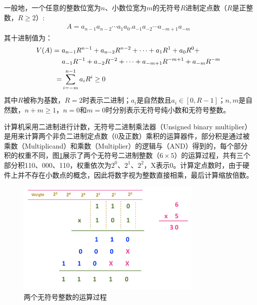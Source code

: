 一般地，一个任意的整数位宽为$n$、小数位宽为$m$的无符号$R$进制定点数（$R$是正整数，$R \geq 2$）:
\begin{equation}
\begin{split}
   A = a_{n-1} a_{n-2} \cdots a_1 a_0 . a_{-1} a_{-2} \cdots a_{-m+1} a_{-m}
\end{split}
\label{EM:Eq:unsigned_fixed_Binary}
\end{equation}
其十进制值为：
\begin{align}
    V(A) = \ & a_{n-1}  R^{n-1} + a_{n-2}  R^{n-2} + \cdots + a_1  R^1 + a_0  R^0 + \notag \\
    & a_{-1}  R^{-1} + a_{-2}  R^{-2} + \cdots + a_{-m+1}  R^{-m+1} + a_{-m}  R^{-m} \notag \\
    = & \sum_{i=-m}^{n-1} a_i  R^i \ge 0
\label{EM:Eq:unsigned_fixed_Decimal}
\end{align}
其中$R$被称为基数，$R=2$时表示二进制；$a_i$是自然数且$a_i \in [0,R-1]$；$n,m$是自然数，$n+m \ge 1$，$n=0$和$m=0$时分别表示无符号纯小数和无符号整数。

计算机采用二进制进行计数，无符号二进制乘法器（Unsigned binary multiplier）是用来计算两个非负二进制定点数（0及正数）乘积的运算器件，部分积是通过被乘数（Multiplicand）和乘数（Multiplier）的逻辑与（AND）得到的，每个部分积的权重不同，图\ref{EM:Fig:unsigned_mul_PP_gen}展示了两个无符号二进制整数（$6\times5$）的运算过程，共有三个部分积110、000、110，权重依次为$2^0$、$2^1$、$2^2$，X表示0。计算定点数时，由于硬件上并不存在小数点的概念，因此将数字视为整数直接相乘，最后计算缩放倍数。
\begin{figure}[!htb]
    \centering
    \includegraphics[width=0.8\textwidth]{figs/EM-Fig-unsigned_mul_PP.png}
    \caption{两个无符号整数的运算过程}
    \label{EM:Fig:unsigned_mul_PP_gen}
\end{figure}




